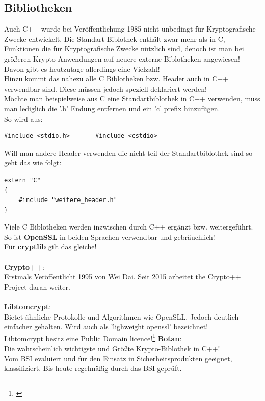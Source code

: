\documentclass[a4paper,12pt]{scrartcl}
\begin{document}
\subsection{Bibliotheken}
Auch C++ wurde bei Veröffentlichung 1985 nicht unbedingt für Kryptografische Zwecke entwickelt. Die Standart Biblothek enthält zwar mehr als in C, Funktionen die für Kryptografische Zwecke nützlich sind, denoch ist man bei größeren Krypto-Anwendungen auf neuere externe Biblotheken angewiesen! Davon gibt es heutzutage allerdings eine Vielzahl!\\
Hinzu kommt das nahezu alle C Biblotheken bzw. Header auch in C++ verwendbar sind. Diese müssen jedoch speziell deklariert werden!\\ 
Möchte man beispielweise aus C eine Standartbiblothek in C++ verwenden, muss man lediglich die '.h' Endung entfernen und ein 'c' prefix hinzufügen.\\ So wird aus: \begin{verbatim}
#include <stdio.h>       #include <cstdio>
\end{verbatim}
Will man andere Header verwenden die nicht teil der Standartbiblothek sind so geht das wie folgt:
\begin{verbatim}
extern "C"
{
    #include "weitere_header.h"
}                                                                                          \end{verbatim}
Viele C Biblotheken werden inzwischen durch C++ ergänzt bzw. weitergeführt. So ist \textbf{OpenSSL} in beiden Sprachen verwendbar und gebräuchlich!\\
Für \textbf{cryptlib} gilt das gleiche!\\
\vspace{1mm}\\
\textbf{Crypto++}:\\ Erstmals Veröffentlicht 1995 von Wei Dai. Seit 2015 arbeitet the Crypto++ Project daran weiter.\\
\vspace{1mm}\\
\textbf{Libtomcrypt}:\\
Bietet ähnliche Protokolle und Algorithmen wie OpenSLL. Jedoch deutlich einfacher gehalten. Wird auch als 'lighweight openssl' bezeichnet!\\Libtomcrypt besitz eine Public Domain licence!\footnote{\cite{HAMMI2018126}}
\newpage
\textbf{Botan}:\\ 
Die wahrscheinlich wichtigste und Größte Krypto-Biblothek in C++!\\ Vom BSI evaluiert und für den Einsatz in Sicherheitsprodukten geeignet, klassifiziert. Bis heute regelmäßig durch das BSI geprüft.\\
\end{document}
